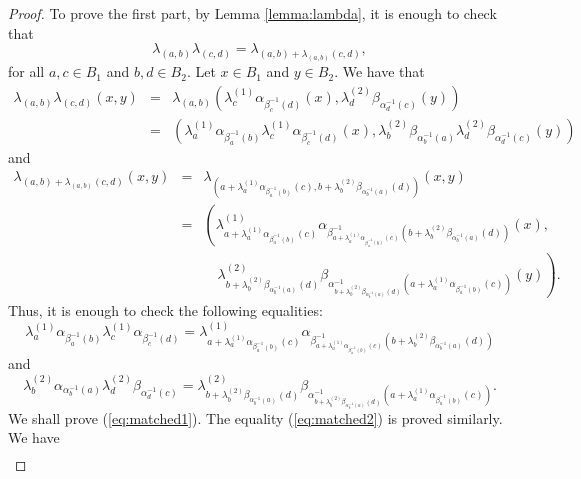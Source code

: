 \begin{proof}
	To prove the first part, by Lemma \ref{lemma:lambda}, it is enough to check that
	$$\lambda_{(a,b)}\lambda_{(c,d)}=\lambda_{(a,b)+\lambda_{(a,b)}(c,d)},$$
	for all $a,c\in B_1$ and $b,d\in B_2$. Let $x\in B_1$ and $y\in B_2$. We have that
	\begin{eqnarray*}
		\lambda_{(a,b)}\lambda_{(c,d)}(x,y)&=&\lambda_{(a,b)}\left( \lambda^{(1)}_{c}\alpha_{\beta^{-1}_{c}(d)}(x), \lambda^{(2)}_{d}\beta_{\alpha^{-1}_{d}(c)}(y)\right)\\
		&=&\left( \lambda^{(1)}_{a}\alpha_{\beta^{-1}_{a}(b)}\lambda^{(1)}_{c}\alpha_{\beta^{-1}_{c}(d)}(x), \lambda^{(2)}_{b}\beta_{\alpha^{-1}_{b}(a)}\lambda^{(2)}_{d}\beta_{\alpha^{-1}_{d}(c)}(y)\right)
	\end{eqnarray*}	
and
	\begin{eqnarray*}
	\lambda_{(a,b)+\lambda_{(a,b)}(c,d)}(x,y)&=&\lambda_{(a+\lambda^{(1)}_{a}\alpha_{\beta^{-1}_{a}(b)}(c),b+\lambda^{(2)}_{b}\beta_{\alpha^{-1}_{b}(a)}(d))}(x,y)\\
	&=&\left( \lambda^{(1)}_{a+\lambda^{(1)}_{a}\alpha_{\beta^{-1}_{a}(b)}(c)}\alpha_{\beta^{-1}_{a+\lambda^{(1)}_{a}\alpha_{\beta^{-1}_{a}(b)}(c)}(b+\lambda^{(2)}_{b}\beta_{\alpha^{-1}_{b}(a)}(d))}(x),\right.\\
	&&\quad\left. \lambda^{(2)}_{b+\lambda^{(2)}_{b}\beta_{\alpha^{-1}_{b}(a)}(d)}\beta_{\alpha^{-1}_{b+\lambda^{(2)}_{b}\beta_{\alpha^{-1}_{b}(a)}(d)}(a+\lambda^{(1)}_{a}\alpha_{\beta^{-1}_{a}(b)}(c))}(y)\right).
\end{eqnarray*}	
Thus, it is enough to check the following equalities:
\begin{equation}\label{eq:matched1}
	\lambda^{(1)}_{a}\alpha_{\beta^{-1}_{a}(b)}\lambda^{(1)}_{c}\alpha_{\beta^{-1}_{c}(d)}=\lambda^{(1)}_{a+\lambda^{(1)}_{a}\alpha_{\beta^{-1}_{a}(b)}(c)}\alpha_{\beta^{-1}_{a+\lambda^{(1)}_{a}\alpha_{\beta^{-1}_{a}(b)}(c)}(b+\lambda^{(2)}_{b}\beta_{\alpha^{-1}_{b}(a)}(d))}
\end{equation}
and
\begin{equation}\label{eq:matched2}
	\lambda^{(2)}_{b}\alpha_{\alpha^{-1}_{b}(a)}\lambda^{(2)}_{d}\beta_{\alpha^{-1}_{d}(c)}=\lambda^{(2)}_{b+\lambda^{(2)}_{b}\beta_{\alpha^{-1}_{b}(a)}(d)}\beta_{\alpha^{-1}_{b+\lambda^{(2)}_{b}\beta_{\alpha^{-1}_{b}(a)}(d)}(a+\lambda^{(1)}_{a}\alpha_{\beta^{-1}_{a}(b)}(c))}.
\end{equation}
We shall prove (\ref{eq:matched1}). The equality (\ref{eq:matched2}) is proved similarly. 
We have
\begin{eqnarray*}

\end{eqnarray*}
\end{proof}
